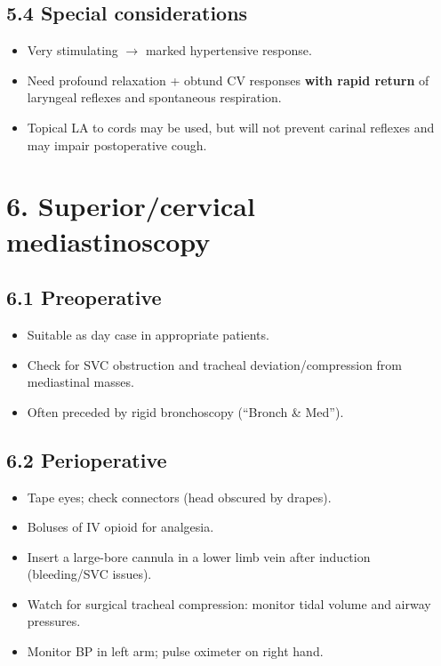 \documentclass[11pt,a4paper]{article}
\begin{document}
\subsection{5.4 Special considerations}
\begin{itemize}[leftmargin=*, itemsep=2pt]
  \item Very stimulating \(\rightarrow\) marked hypertensive response.
  \item Need profound relaxation + obtund CV responses \textbf{with rapid return} of laryngeal reflexes and spontaneous respiration.
  \item Topical LA to cords may be used, but will not prevent carinal reflexes and may impair postoperative cough.
\end{itemize}

\section{6. Superior/cervical mediastinoscopy}

\subsection{6.1 Preoperative}
\begin{itemize}[leftmargin=*, itemsep=2pt]
  \item Suitable as day case in appropriate patients.
  \item Check for SVC obstruction and tracheal deviation/compression from mediastinal masses.
  \item Often preceded by rigid bronchoscopy (``Bronch \& Med'').
\end{itemize}

\subsection{6.2 Perioperative}
\begin{itemize}[leftmargin=*, itemsep=2pt]
  \item Tape eyes; check connectors (head obscured by drapes).
  \item Boluses of IV opioid for analgesia.
  \item Insert a large-bore cannula in a lower limb vein after induction (bleeding/SVC issues).
  \item Watch for surgical tracheal compression: monitor tidal volume and airway pressures.
  \item Monitor BP in left arm; pulse oximeter on right hand.
\end{itemize}
\end{document}
